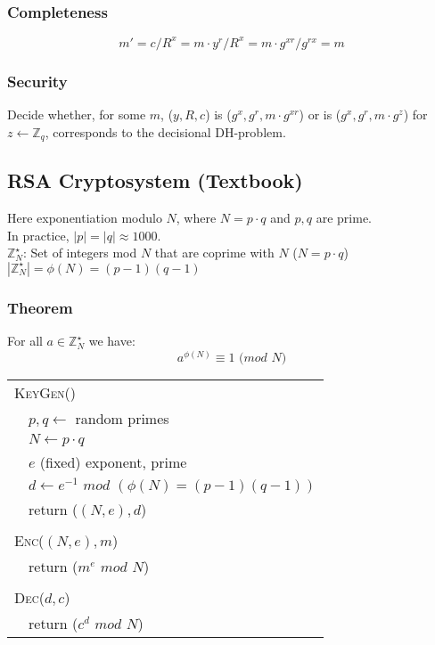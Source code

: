 \documentclass{report}
\begin{document}
\begin{adjustwidth}{2em}{2em}
\begin{adjustwidth}{2em}{}
		\subsubsection{Completeness}
		\[
			m' = c/R^x = m \cdot y^r / R^x = m \cdot g^{xr} / g^{rx} = m
		\]
		\subsubsection{Security}
		\begin{adjustwidth}{2em}{}
			Decide whether, for some $m$, ($y, R, c$) is ($g^x, g^r, m \cdot g^{xr}$) or is ($g^x, g^r, m \cdot g^z$) for $z \leftarrow \mathbb{Z}_q$, corresponds to the decisional DH-problem.
		\end{adjustwidth}
	\end{adjustwidth}
	\subsection{RSA Cryptosystem (Textbook)}
	\begin{adjustwidth}{2em}{}
		Here exponentiation modulo $N$, where $N = p \cdot q$ and $p,q$ are prime. \\
		In practice, $|p| = |q| \approx 1000$. \\
		$\mathbb{Z}_N^{\star}$: Set of integers mod $N$ that are coprime with $N$ ($N = p \cdot q$) \\
		$|\mathbb{Z}_N^{\star}| = \phi (N) = (p-1)(q-1)$
		\subsubsection{Theorem}
		\begin{adjustwidth}{2em}{}
			For all $a \in \mathbb{Z}_N^{\star}$ we have:
			\[
				a^{\phi (N)} \equiv 1 \textit{ (mod N)}
			\]
		\end{adjustwidth}
		\begin{tabular}{ll}
			\multicolumn{2}{l}{\textsc{KeyGen}()} \\
			& $p,q \leftarrow $ random primes \\
			& $N \leftarrow p \cdot q$ \\
			& $e$ (fixed) exponent, prime \\
			& $d \leftarrow e^{-1} \textit{ mod } (\phi (N) = (p-1)(q-1))$ \\
			& return ($(N,e), d$) \\
			\\
			\multicolumn{2}{l}{\textsc{Enc}($(N, e), m$)} \\
			& return ($m^e \textit{ mod } N$) \\
			\\
			\multicolumn{2}{l}{\textsc{Dec}($d, c$)} \\
			& return ($c^d \textit{ mod } N$) \\
		\end{tabular}

\end{adjustwidth}
\end{adjustwidth}
\end{document}
